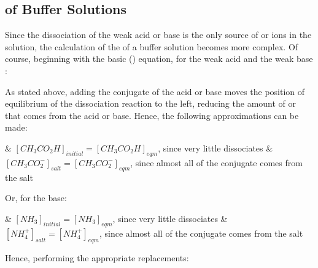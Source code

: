

		\pagebreak
		\subsection{\texorpdfstring{\MpH{}}{pH} of Buffer Solutions}

			Since the dissociation of the weak acid or base is  the only source of  or  ions in the solution,
			the calculation of the \pH{} of a buffer solution becomes more complex. Of course, beginning with the basic ()
			equation, for the weak acid  and the weak base :


			As stated above, adding the conjugate of the acid or base moves the position of equilibrium of the dissociation reaction to the left,
			reducing the amount of  or  that comes from the acid or base. Hence, the following approximations can be made:

			\begin{bulletlist}
				& $[CH_{3}CO_{2}H]_{initial} = [CH_{3}CO_{2}H]_{eqm}$, since very little  dissociates
				& $[CH_{3}CO_{2}^{-}]_{salt} = [CH_{3}CO_{2}^{-}]_{eqm}$, since almost all of the conjugate comes from the salt
			\end{bulletlist}

			Or, for the base:
			\begin{bulletlist}
				& $[NH_{3}]_{initial} = [NH_{3}]_{eqm}$, since very little  dissociates
				& $[NH_{4}^{+}]_{salt} = [NH_{4}^{+}]_{eqm}$, since almost all of the conjugate comes from the salt
			\end{bulletlist}

			Hence, performing the appropriate replacements:




